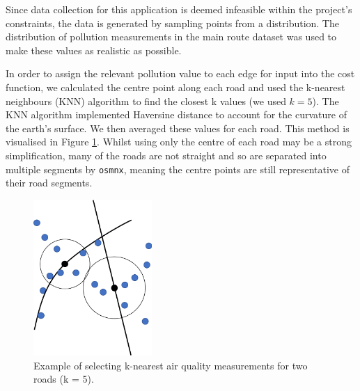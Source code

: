 \documentclass[11pt]{report}
\begin{document}

Since data collection for this application is deemed infeasible within the project's constraints, the data is generated by sampling points from a distribution. The distribution of pollution measurements in the main route dataset was used to make these values as realistic as possible.

In order to assign the relevant pollution value to each edge for input into the cost function, we calculated the centre point along each road and used the k-nearest neighbours (KNN) algorithm to find the closest k values (we used $k=5$). The KNN algorithm implemented Haversine distance to account for the curvature of the earth's surface. We then averaged these values for each road. This method is visualised in Figure \ref{fig:knn}. Whilst using only the centre of each road may be a strong simplification, many of the roads are not straight and so are separated into multiple segments by \texttt{osmnx}, meaning the centre points are still representative of their road segments.


\begin{figure}[!tb]
\centering
\includegraphics[width=0.4\textwidth]{images/knn}
\caption[K-nearest neighbours.]{Example of selecting k-nearest air quality measurements for two roads (k = 5).}
\label{fig:knn}
\end{figure}
\end{document}
